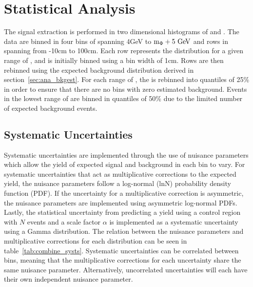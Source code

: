 \section{Statistical Analysis} \label{sec:ana_stats}

The signal extraction is performed in two dimensional histograms of \lxy and \mgg. The data are binned in four bins of \mgg spanning 4\unit{GeV} to $\mphi+5\unit{GeV}$ and rows in \lxy spanning from -10\unit{cm} to 100\unit{cm}. Each row represents the \lxy distribution for a given range of \mgg, and is initially binned using a bin width of 1\unit{cm}. Rows are then rebinned using the expected background distribution derived in section~\ref{sec:ana_bkgest}. For each range of \mgg, the \lxy is rebinned into quantiles of 25\% in order to ensure that there are no bins with zero estimated background. Events in the lowest range of \mgg are binned in quantiles of 50\% due to the limited number of expected background events.

\subsection{Systematic Uncertainties} \label{sec:ana_systs}
Systematic uncertainties are implemented through the use of nuisance parameters which allow the yield of expected signal and background in each bin to vary. For systematic uncertainties that act as multiplicative corrections to the expected yield, the nuisance parameters follow a log-normal (lnN) probability density function (PDF). If the uncertainty for a multiplicative correction is asymmetric, the nuisance parameters are implemented using asymmetric log-normal PDFs. Lastly, the statistical uncertainty from predicting a yield using a control region with $N$ events and a scale factor $\alpha$ is implemented as a systematic uncertainty using a Gamma distribution. The relation between the nuisance parameters and multiplicative corrections for each distribution can be seen in table~\ref{tab:combine_systs}. Systematic uncertainties can be correlated between bins, meaning that the multiplicative corrections for each uncertainty share the same nuisance parameter. Alternatively, uncorrelated uncertainties will each have their own independent nuisance parameter.

